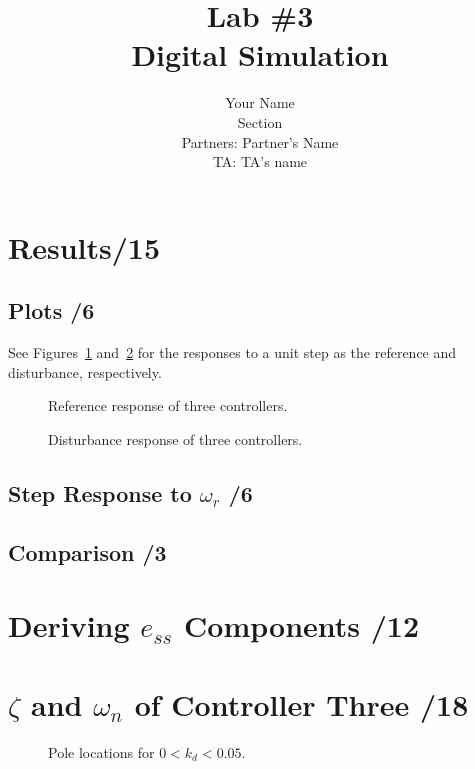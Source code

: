 \documentclass{article}
\title{Lab \#3\\{\sc Digital Simulation}}
\author{Your Name\\ Section\\
  Partners: Partner's Name\\
  TA: TA's name}
\newcommand{\score}{\hfill \underline{\hspace{1cm}}/}
\begin{document}
\maketitle
{}
\section{{\sc Results}\score 15}
\subsection{Plots \score 6}
See Figures~\ref{ref_resp} and~\ref{dist_resp} for the responses to a unit step as the reference and disturbance, respectively.

\begin{figure}[htbp]
\centering
\caption{Reference response of three controllers.}
\label{ref_resp}
\end{figure}

\begin{figure}[htbp]
\centering
\caption{Disturbance response of three controllers.}
\label{dist_resp}
\end{figure}

\subsection{Step Response to $\omega_r$ \score 6}
%

\subsection{Comparison \score 3}


\section{{\sc Deriving $e_{ss}$ Components} \score 12}

\section{{\sc $\zeta$ and $\omega_n$ of Controller Three} \score 18}


\begin{figure}[htbp]
\centering
\caption{Pole locations for $0<k_d<0.05$.}
\label{poles}
\end{figure}
\end{document}

